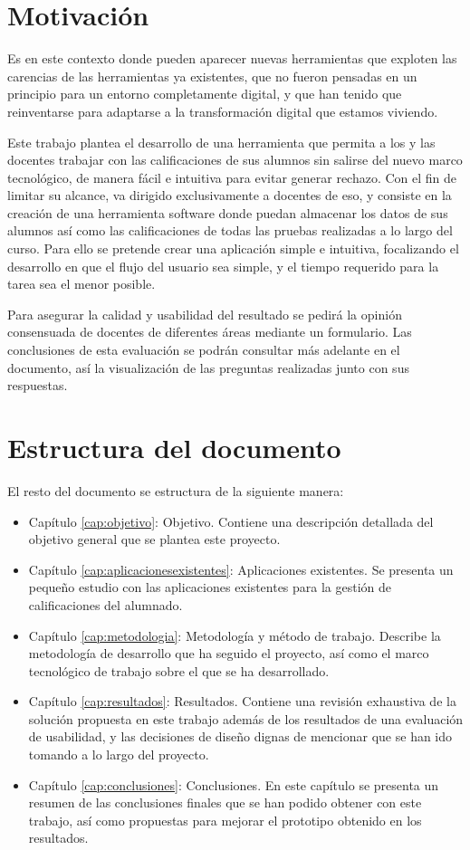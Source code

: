 \section{Motivación}

Es en este contexto donde pueden aparecer nuevas herramientas que exploten las carencias de las herramientas ya existentes, que no fueron pensadas en un principio para un entorno completamente digital, y que han tenido que reinventarse para adaptarse a la transformación digital que estamos viviendo. 

Este trabajo plantea el desarrollo de una herramienta que permita a los y las docentes trabajar con las calificaciones de sus alumnos sin salirse del nuevo marco tecnológico, de manera fácil e intuitiva para evitar generar rechazo. Con el fin de limitar su alcance, va dirigido exclusivamente a docentes de \gls{eso}, y consiste en la creación de una herramienta software donde puedan almacenar los datos de sus alumnos así como las calificaciones de todas las pruebas realizadas a lo largo del curso. Para ello se pretende crear una aplicación simple e intuitiva, focalizando el desarrollo en que el flujo del usuario sea simple, y el tiempo requerido para la tarea sea el menor posible.

Para asegurar la calidad y usabilidad del resultado se pedirá la opinión consensuada de docentes de diferentes áreas mediante un formulario. Las conclusiones de esta evaluación se podrán consultar más adelante en el documento, así la visualización de las preguntas realizadas junto con sus respuestas.


\section{Estructura del documento}
El resto del documento se estructura de la siguiente manera:

\begin{itemize}
    \item Capítulo \ref{cap:objetivo}: Objetivo. Contiene una descripción detallada del objetivo general que se plantea este proyecto.
    \item Capítulo \ref{cap:aplicacionesexistentes}: Aplicaciones existentes. Se presenta un pequeño estudio con las aplicaciones existentes para la gestión de calificaciones del alumnado.
    \item Capítulo \ref{cap:metodologia}: Metodología y método de trabajo. Describe la metodología de desarrollo que ha seguido el proyecto, así como el marco tecnológico de trabajo sobre el que se ha desarrollado.
    \item Capítulo \ref{cap:resultados}: Resultados. Contiene una revisión exhaustiva de la solución propuesta en este trabajo además de los resultados de una evaluación de usabilidad, y las decisiones de diseño dignas de mencionar que se han ido tomando a lo largo del proyecto.
    \item Capítulo \ref{cap:conclusiones}: Conclusiones. En este capítulo se presenta un resumen de las conclusiones finales que se han podido obtener con este trabajo, así como propuestas para mejorar el prototipo obtenido en los resultados.
\end{itemize}
